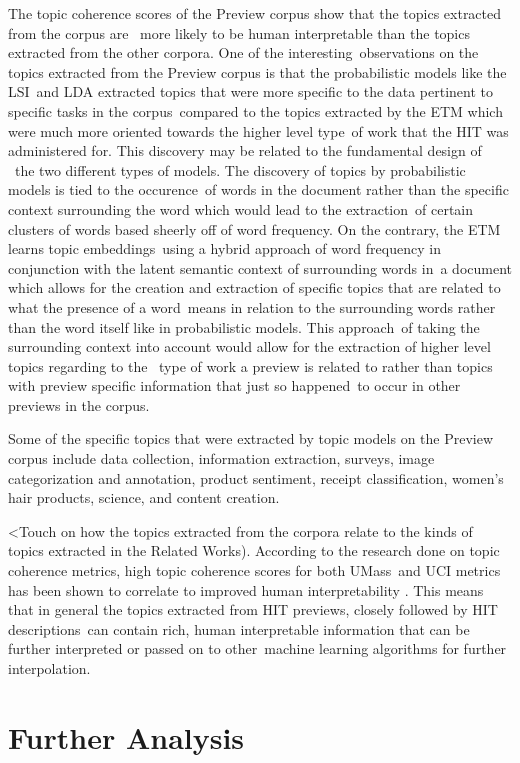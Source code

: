 \documentclass[letterpaper,12pt]{article}
\begin{document}
The topic coherence scores of the Preview corpus show that the topics extracted from the corpus are \
more likely to be human interpretable than the topics extracted from the other corpora. One of the interesting\
observations on the topics extracted from the Preview corpus is that the probabilistic models like the LSI\
and LDA extracted topics that were more specific to the data pertinent to specific tasks in the corpus\
compared to the topics extracted by the ETM which were much more oriented towards the higher level type\
of work that the HIT was administered for. This discovery may be related to the fundamental design of \
the two different types of models. The discovery of topics by probabilistic models is tied to the occurence\
of words in the document rather than the specific context surrounding the word which would lead to the extraction\
of certain clusters of words based sheerly off of word frequency. On the contrary, the ETM learns topic embeddings\
using a hybrid approach of word frequency in conjunction with the latent semantic context of surrounding words in\
a document which allows for the creation and extraction of specific topics that are related to what the presence of a word\
means in relation to the surrounding words rather than the word itself like in probabilistic models. This approach\
of taking the surrounding context into account would allow for the extraction of higher level topics regarding to the \
type of work a preview is related to rather than topics with preview specific information that just so happened\
to occur in other previews in the corpus.

Some of the specific topics that were extracted by topic models on the Preview corpus include data collection,
information extraction, surveys, image categorization and annotation, product sentiment, receipt classification,
women's hair products, science, and content creation.

<Touch on how the topics extracted from the corpora relate to the kinds of topics extracted in the Related Works).
According to the research done on topic coherence metrics, high topic coherence scores for both UMass\
and UCI metrics has been shown to correlate to improved human interpretability \cite{mimno2011optimizing,newman2010automatic}.
This means that in general the topics extracted from HIT previews, closely followed by HIT descriptions\
can contain rich, human interpretable information that can be further interpreted or passed on to other\
machine learning algorithms for further interpolation.
\chapter{Further Analysis}
\end{document}
